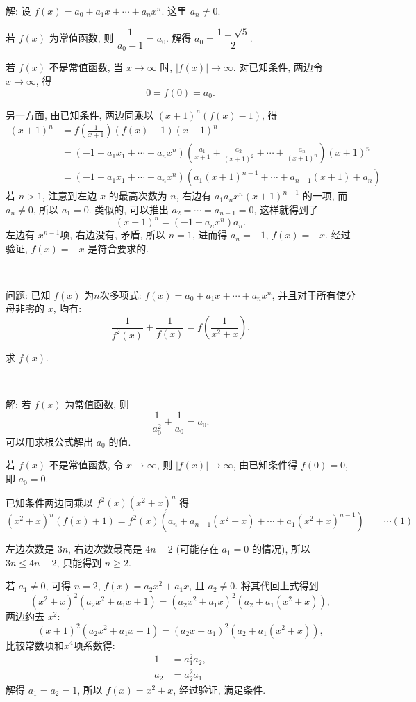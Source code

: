 ~

解: 设 $f(x) = a_0 + a_1x + \cdots + a_nx^n$. 这里 $a_n\neq 0$.

若 $f(x)$ 为常值函数, 则 $\dfrac{1}{a_0-1}=a_0$. 解得 $a_0 = \dfrac{1\pm\sqrt{5}}{2}$.

若 $f(x)$ 不是常值函数, 当 $x\to\infty$ 时, $|f(x)|\to\infty$. 对已知条件, 两边令 $x\to \infty$, 得
\[0 = f(0) = a_0.\]

另一方面, 由已知条件, 两边同乘以 $(x+1)^n(f(x)-1)$, 得
\begin{align*}
(x+1)^n &= f(\frac{1}{x+1})(f(x)-1)(x+1)^n \\
&= (-1+a_1x_1+\cdots+a_nx^n)(\frac{a_1}{x+1}+\frac{a_2}{(x+1)^2}+\cdots+\frac{a_n}{(x+1)^n})(x+1)^n\\
&= (-1+a_1x_1+\cdots+a_nx^n)(a_1(x+1)^{n-1}+\cdots+a_{n-1}(x+1)+a_n)
\end{align*}
若 $n > 1$, 注意到左边 $x$ 的最高次数为 $n$, 右边有 $a_1a_nx^n(x+1)^{n-1}$ 的一项, 而 $a_n\neq 0$, 所以 $a_1=0$. 类似的, 可以推出 $a_2=\cdots=a_{n-1}=0$, 这样就得到了
\[(x+1)^n = (-1+a_nx^n)a_n .\]
左边有 $x^{n-1}$项, 右边没有, 矛盾, 所以 $n=1$, 进而得 $a_n=-1$, $f(x)=-x$. 经过验证, $f(x)=-x$ 是符合要求的.

~

问题: 已知 $f(x)$ 为$n$次多项式: $f(x) = a_0 + a_1x + \cdots + a_nx^n$, 并且对于所有使分母非零的 $x$, 均有:
\[ \frac{1}{f^2(x)} + \frac{1}{f(x)} = f(\frac{1}{x^2+x}) .\]

求 $f(x)$.

~

解: 若 $f(x)$ 为常值函数, 则
\[\frac{1}{a_0^2} + \frac{1}{a_0} = a_0 .\]
可以用求根公式解出 $a_0$ 的值.

若 $f(x)$ 不是常值函数, 令 $x\to\infty$, 则 $|f(x)|\to\infty$, 由已知条件得 $f(0) = 0$, 即 $a_0 = 0$.

已知条件两边同乘以 $f^2(x)(x^2+x)^n$ 得
\[ (x^2+x)^n (f(x)+1) = f^2(x)(a_n + a_{n-1}(x^2+x) + \cdots + a_1(x^2+x)^{n-1}) \qquad\cdots (1)\]

左边次数是 $3n$, 右边次数最高是 $4n-2$ (可能存在 $a_1=0$ 的情况),
所以 $3n\le 4n-2$, 只能得到 $n\ge 2$. 

若 $a_1\neq 0$, 可得 $n=2$, $f(x) = a_2x^2 + a_1x$, 且 $a_2\neq 0$. 将其代回上式得到
\[(x^2+x)^2(a_2x^2+a_1x+1) = (a_2x^2+a_1x)^2(a_2+a_1(x^2+x)) ,\]
两边约去 $x^2$:
\[ (x+1)^2(a_2x^2+a_1x+1) = (a_2x+a_1)^2(a_2+a_1(x^2+x)), \]
比较常数项和$x^4$项系数得:
\begin{align*} 
1 &= a_1^2a_2 ,\\ 
a_2 &= a_2^2a_1 
\end{align*} 
解得 $a_1=a_2=1$, 所以 $f(x) = x^2+x$, 经过验证, 满足条件.

